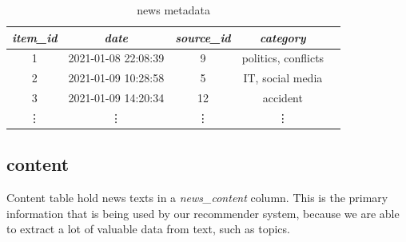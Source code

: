 \documentclass{article}
\begin{document}
\begin{table}[h]
    \centering
    \begin{tabular}{ccccc}
        \toprule

        \emph{item\_id} & \emph{date} & \emph{source\_id} & \emph{category}\\\midrule

        1 & 2021-01-08 22:08:39 & 9  & politics, conflicts\\
        2 & 2021-01-09 10:28:58 & 5  & IT, social media\\
        3 & 2021-01-09 14:20:34 & 12 & accident\\
        \vdots & \vdots & \vdots & \vdots \\\bottomrule
    \end{tabular}

    \caption{news metadata}
    \label{tab:meta}
\end{table}




\subsection*{content}

Content table hold news texts in a \textit{news\_content} column. This is the primary information that is being used by our recommender system, because we are able to extract a lot of valuable data from text, such as topics.

\begin{table}[h]
    \centering
    \caption{news item}
    \label{tab:item}
\end{table}
\end{document}
